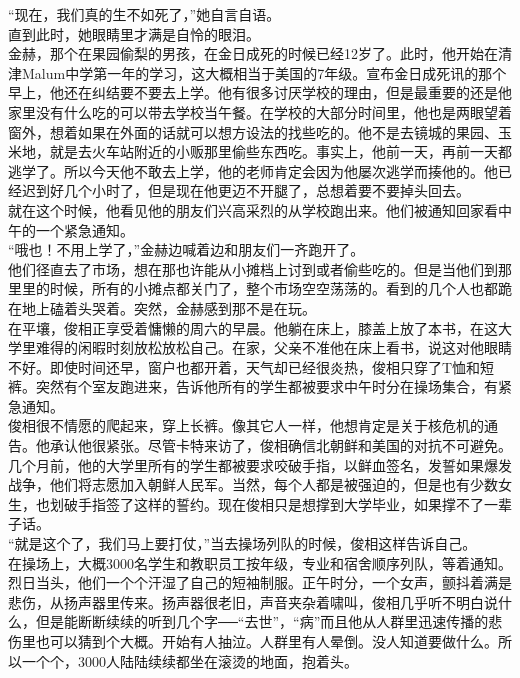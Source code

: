 “现在，我们真的生不如死了，”她自言自语。\\

直到此时，她眼睛里才满是自怜的眼泪。\\

金赫，那个在果园偷梨的男孩，在金日成死的时候已经12岁了。此时，他开始在清津Malum中学第一年的学习，这大概相当于美国的7年级。宣布金日成死讯的那个早上，他还在纠结要不要去上学。他有很多讨厌学校的理由，但是最重要的还是他家里没有什么吃的可以带去学校当午餐。在学校的大部分时间里，他也是两眼望着窗外，想着如果在外面的话就可以想方设法的找些吃的。他不是去镜城的果园、玉米地，就是去火车站附近的小贩那里偷些东西吃。事实上，他前一天，再前一天都逃学了。所以今天他不敢去上学，他的老师肯定会因为他屡次逃学而揍他的。他已经迟到好几个小时了，但是现在他更迈不开腿了，总想着要不要掉头回去。\\

就在这个时候，他看见他的朋友们兴高采烈的从学校跑出来。他们被通知回家看中午的一个紧急通知。\\

“哦也！不用上学了，”金赫边喊着边和朋友们一齐跑开了。\\

他们径直去了市场，想在那也许能从小摊档上讨到或者偷些吃的。但是当他们到那里里的时候，所有的小摊点都关门了，整个市场空空荡荡的。看到的几个人也都跪在地上磕着头哭着。突然，金赫感到那不是在玩。\\

在平壤，俊相正享受着慵懒的周六的早晨。他躺在床上，膝盖上放了本书，在这大学里难得的闲暇时刻放松放松自己。在家，父亲不准他在床上看书，说这对他眼睛不好。即使时间还早，窗户也都开着，天气却已经很炎热，俊相只穿了T恤和短裤。突然有个室友跑进来，告诉他所有的学生都被要求中午时分在操场集合，有紧急通知。\\

俊相很不情愿的爬起来，穿上长裤。像其它人一样，他想肯定是关于核危机的通告。他承认他很紧张。尽管卡特来访了，俊相确信北朝鲜和美国的对抗不可避免。几个月前，他的大学里所有的学生都被要求咬破手指，以鲜血签名，发誓如果爆发战争，他们将志愿加入朝鲜人民军。当然，每个人都是被强迫的，但是也有少数女生，也划破手指签了这样的誓约。现在俊相只是想撑到大学毕业，如果撑不了一辈子话。\\

“就是这个了，我们马上要打仗，”当去操场列队的时候，俊相这样告诉自己。\\

在操场上，大概3000名学生和教职员工按年级，专业和宿舍顺序列队，等着通知。烈日当头，他们一个个汗湿了自己的短袖制服。正午时分，一个女声，颤抖着满是悲伤，从扬声器里传来。扬声器很老旧，声音夹杂着啸叫，俊相几乎听不明白说什么，但是能断断续续的听到几个字──“去世”，“病”而且他从人群里迅速传播的悲伤里也可以猜到个大概。开始有人抽泣。人群里有人晕倒。没人知道要做什么。所以一个个，3000人陆陆续续都坐在滚烫的地面，抱着头。\\

